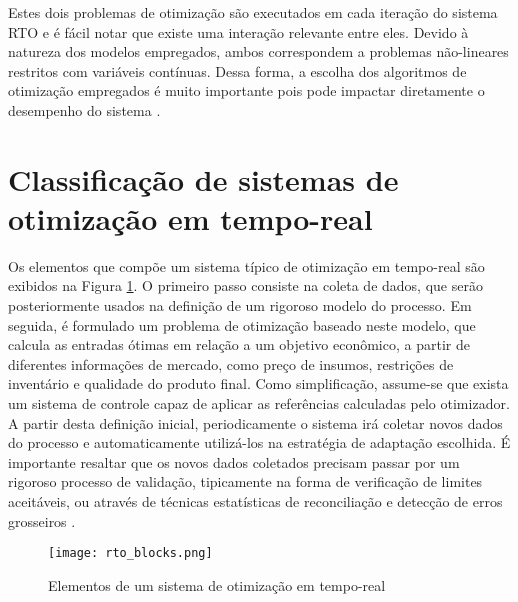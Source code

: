\documentclass[conference]{IEEEtran}
\begin{document}
Estes dois problemas de otimização são executados em cada iteração do sistema RTO e é fácil notar que existe uma interação relevante entre eles. Devido à natureza dos modelos empregados, ambos correspondem a problemas não-lineares restritos com variáveis contínuas. Dessa forma, a escolha dos algoritmos de otimização empregados é muito importante pois pode impactar diretamente o desempenho do sistema \cite{quelhas2013common}.

\section{Classificação de sistemas de otimização em tempo-real}

Os elementos que compõe um sistema típico de otimização em tempo-real são exibidos na Figura \ref{fig:rtoOverview}. O primeiro passo consiste na coleta de dados, que serão posteriormente usados na definição de um rigoroso modelo do processo. Em seguida, é formulado um problema de otimização baseado neste modelo, que calcula as entradas ótimas em relação a um objetivo econômico, a partir de diferentes informações de mercado, como preço de insumos, restrições de inventário e qualidade do produto final. Como simplificação, assume-se que exista um sistema de controle capaz de aplicar as referências calculadas pelo otimizador. A partir desta definição inicial, periodicamente o sistema irá coletar novos dados do processo e automaticamente utilizá-los na estratégia de adaptação escolhida. É importante resaltar que os novos dados coletados precisam passar por um rigoroso processo de validação, tipicamente na forma de verificação de limites aceitáveis, ou através de técnicas estatísticas de reconciliação e detecção de erros grosseiros \cite{bagajewicz2000brief}. 

\begin{figure}[htb]
	\centering
	\texttt{[image: rto\_blocks.png]}
	\caption{\label{fig:rtoOverview}Elementos de um sistema de otimização em tempo-real}
\end{figure}
\end{document}
